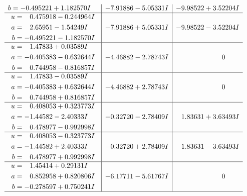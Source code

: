 \documentclass[1p]{elsarticle_modified}
\theoremstyle{definition}
\begin{document}
$$\begin{array}{c|c|c}
\begin{aligned}
b &= -0.495221 + 1.182570 I\end{aligned}
 & -7.91886 - 5.05331 I & -9.98522 + 3.52204 I \\ \hline\begin{aligned}
u &= \phantom{-}0.475918 - 0.244964 I \\
a &= \phantom{-}2.65951 - 1.54249 I \\
b &= -0.495221 - 1.182570 I\end{aligned}
 & -7.91886 + 5.05331 I & -9.98522 - 3.52204 I \\ \hline\begin{aligned}
u &= \phantom{-}1.47833 + 0.03589 I \\
a &= -0.405383 - 0.632644 I \\
b &= \phantom{-}0.744958 - 0.816857 I\end{aligned}
 & -4.46882 - 2.78743 I & \phantom{-0.000000 } 0 \\ \hline\begin{aligned}
u &= \phantom{-}1.47833 - 0.03589 I \\
a &= -0.405383 + 0.632644 I \\
b &= \phantom{-}0.744958 + 0.816857 I\end{aligned}
 & -4.46882 + 2.78743 I & \phantom{-0.000000 } 0 \\ \hline\begin{aligned}
u &= \phantom{-}0.408053 + 0.323773 I \\
a &= -1.44582 - 2.40333 I \\
b &= \phantom{-}0.478977 - 0.992998 I\end{aligned}
 & -0.32720 - 2.78409 I & \phantom{-}1.83631 + 3.63493 I \\ \hline\begin{aligned}
u &= \phantom{-}0.408053 - 0.323773 I \\
a &= -1.44582 + 2.40333 I \\
b &= \phantom{-}0.478977 + 0.992998 I\end{aligned}
 & -0.32720 + 2.78409 I & \phantom{-}1.83631 - 3.63493 I \\ \hline\begin{aligned}
u &= \phantom{-}1.45414 + 0.29131 I \\
a &= \phantom{-}0.852958 + 0.820806 I \\
b &= -0.278597 + 0.750241 I\end{aligned}
 & -6.17711 - 5.61767 I & \phantom{-0.000000 } 0\\
 \hline 
 \end{array}$$\newpage$$\begin{array}{c|c|c}  

\end{array}$$
\end{document}
